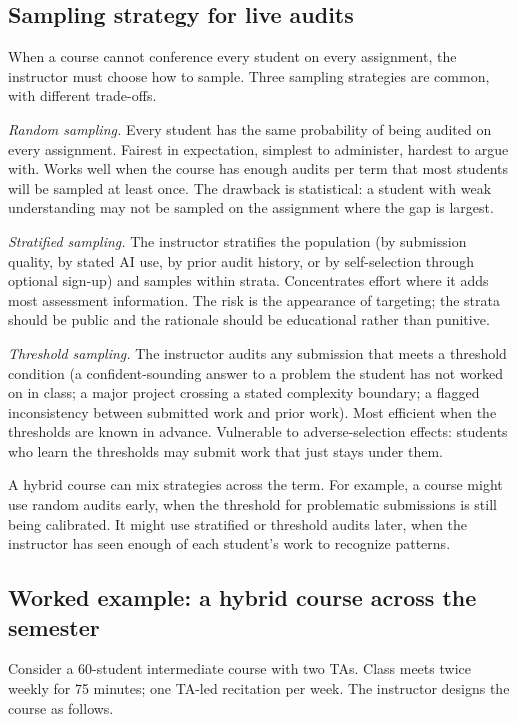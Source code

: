 \documentclass{SIAMbook2023}
\begin{document}
\subsection{Sampling strategy for live audits}
\label{i:subsec:hybrid-sampling}%

When a course cannot conference every student on every assignment, the instructor must choose how to sample. Three sampling strategies are common, with different trade-offs.

\emph{Random sampling.} Every student has the same probability of being audited on every assignment. Fairest in expectation, simplest to administer, hardest to argue with. Works well when the course has enough audits per term that most students will be sampled at least once. The drawback is statistical: a student with weak understanding may not be sampled on the assignment where the gap is largest.

\emph{Stratified sampling.} The instructor stratifies the population (by submission quality, by stated AI use, by prior audit history, or by self-selection through optional sign-up) and samples within strata. Concentrates effort where it adds most assessment information. The risk is the appearance of targeting; the strata should be public and the rationale should be educational rather than punitive.

\emph{Threshold sampling.} The instructor audits any submission that meets a threshold condition (a confident-sounding answer to a problem the student has not worked on in class; a major project crossing a stated complexity boundary; a flagged inconsistency between submitted work and prior work). Most efficient when the thresholds are known in advance. Vulnerable to adverse-selection effects: students who learn the thresholds may submit work that just stays under them.

A hybrid course can mix strategies across the term. For example, a course might use random audits early, when the threshold for problematic submissions is still being calibrated. It might use stratified or threshold audits later, when the instructor has seen enough of each student's work to recognize patterns.

\subsection{Worked example: a hybrid course across the semester}
\label{i:subsec:hybrid-example}

Consider a 60-student intermediate course with two TAs. Class meets twice weekly for 75 minutes; one TA-led recitation per week. The instructor designs the course as follows.
\end{document}

